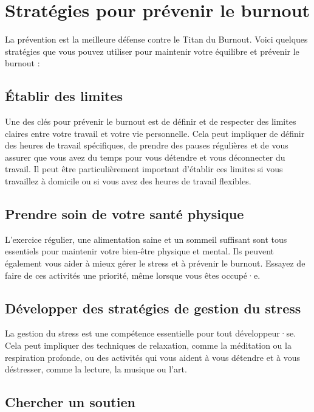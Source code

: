 \section{Stratégies pour prévenir le burnout}

La prévention est la meilleure défense contre le Titan du Burnout. Voici quelques stratégies que vous pouvez utiliser pour maintenir votre équilibre et prévenir le burnout :

\subsection{Établir des limites}

Une des clés pour prévenir le burnout est de définir et de respecter des limites claires entre votre travail et votre vie personnelle. Cela peut impliquer de définir des heures de travail spécifiques, de prendre des pauses régulières et de vous assurer que vous avez du temps pour vous détendre et vous déconnecter du travail. Il peut être particulièrement important d'établir ces limites si vous travaillez à domicile ou si vous avez des heures de travail flexibles.

\subsection{Prendre soin de votre santé physique}

L'exercice régulier, une alimentation saine et un sommeil suffisant sont tous essentiels pour maintenir votre bien-être physique et mental. Ils peuvent également vous aider à mieux gérer le stress et à prévenir le burnout. Essayez de faire de ces activités une priorité, même lorsque vous êtes occupé·e.

\subsection{Développer des stratégies de gestion du stress}

La gestion du stress est une compétence essentielle pour tout développeur·se. Cela peut impliquer des techniques de relaxation, comme la méditation ou la respiration profonde, ou des activités qui vous aident à vous détendre et à vous déstresser, comme la lecture, la musique ou l'art.

\subsection{Chercher un soutien}

